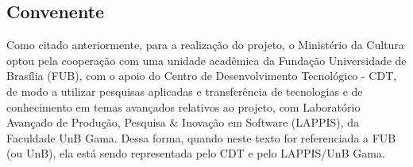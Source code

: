% 

 
 
% 
\subsection{Convenente}

Como citado anteriormente, para a realização do projeto, o Ministério da Cultura optou pela cooperação com uma unidade acadêmica da
Fundação Universidade de Brasília (FUB), com o apoio do Centro de
Desenvolvimento Tecnológico - CDT, de modo a utilizar pesquisas aplicadas e
transferência de tecnologias e de conhecimento em temas avançados relativos
ao projeto, com Laboratório Avançado de Produção, Pesquisa \& Inovação em
Software (LAPPIS), da Faculdade UnB Gama. Dessa forma, quando neste texto for
referenciada a FUB (ou UnB), ela está sendo representada pelo CDT e pelo
LAPPIS/UnB Gama.

